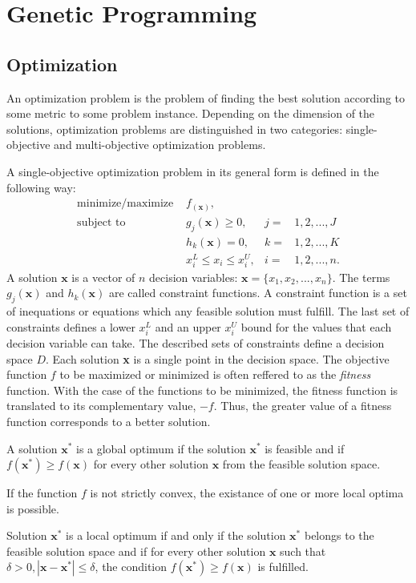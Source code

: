 \chapter{Genetic Programming}
\label{genprog}
\section{Optimization}
An optimization problem is the problem of finding the best solution according to some metric to some problem instance.%
Depending on the dimension of the solutions, optimization problems are distinguished in two categories: single-objective and multi-objective optimization problems.

A single-objective optimization problem in its general form is defined in the following way:
\begin{align*}
\label{opt_problem}
\text{minimize/maximize } & f_(\textbf{x}),   \\
\text{subject to } & g_j(\textbf{x}) \geq 0, & j = & 1, 2, ..., J \\
           & h_k(\textbf{x}) = 0, & k = & 1, 2, ..., K \\
           & x_{i}^{L} \leq x_i \leq x_{i}^{U}, & i = & 1, 2, ..., n. 
\end{align*}
A solution $\textbf{x}$ is a vector of $n$ decision variables: $\textbf{x} = \{x_1,x_2,...,x_n\}$.
The terms $g_j(\textbf{x})$ and $h_k(\textbf{x})$ are called constraint functions. 
A constraint function is a set of inequations or equations which any feasible solution must fulfill. 
The last set of constraints defines a lower $x_{i}^{L}$ and an upper $x_{i}^{U}$ bound for the values that each decision variable can take. 
The described sets of constraints define a decision space $D$.
Each solution \textbf{x} is a single point in the decision space.
The objective function $f$ to be maximized or minimized is often reffered to as the \textit{fitness} function.
With the case of the functions to be minimized, the fitness function is translated to its complementary value, $-f$.
Thus, the greater value of a fitness function corresponds to a better solution.

\begin{mydef}
A solution $\textbf{x}^{*}$ is a global optimum if the solution $\textbf{x}^{*}$ is feasible and if $f(\textbf{x}^{*}) \geq f(\textbf{x})$ for every other solution $\textbf{x}$ from the feasible solution space.
\end{mydef}
If the function $f$ is not strictly convex, the existance of one or more local optima is possible.
\begin{mydef}
Solution $\textbf{x}^{*}$ is a local optimum if and only if the solution $\textbf{x}^{*}$ belongs to the feasible solution space and if for every other solution $\textbf{x}$ such that 
$\delta > 0, |\textbf{x} - \textbf{x}^{*}| \leq \delta$, the condition $f(\textbf{x}^{*}) \geq f(\textbf{x})$ is fulfilled.
\end{mydef}

